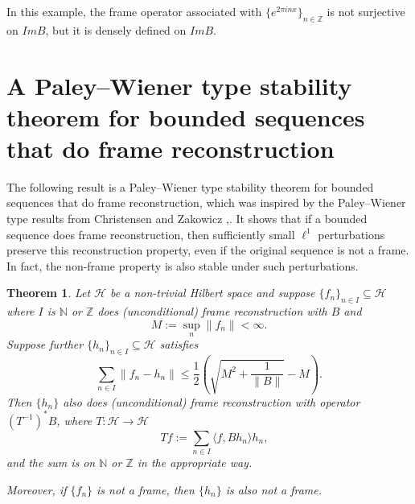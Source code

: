 \documentclass[11pt]{amsart}
\newtheorem{thm}{Theorem}[section]
\theoremstyle{definition}
\numberwithin{equation}{section}
\newcommand{\Hcal}{\mathcal{H}} %
\begin{document}
In this example, the frame operator associated with $\{e^{2\pi i nx}\}_{n\in \mathbb{Z}}$ is not surjective on $ImB$, but it is densely defined on $Im B$.

\section{A Paley–Wiener type stability theorem for bounded sequences that do frame reconstruction}\label{s5}
The following result is a Paley–Wiener type stability theorem for bounded sequences that do frame reconstruction, which was inspired by the Paley–Wiener type results from Christensen and Zakowicz \cite{Christensen2017Paley-Wiener},\cite{Christensen1995Paley-Wiener}. It shows that if a bounded sequence does frame reconstruction, then sufficiently small $\ell^1$ perturbations preserve this reconstruction property, even if the original sequence is not a frame. In fact, the non-frame property is also stable under such perturbations.
\begin{thm}
Let $\Hcal$ be a non-trivial Hilbert space and suppose $\{f_{n}\}_{n\in I}\subseteq \Hcal$ where $I$ is $\mathbb{N}$ or $\mathbb{Z}$ does (unconditional) frame reconstruction with $B$ and
\[
M := \sup_n \|f_n\| < \infty.
\]
Suppose further \(\{h_n\}_{n\in I}\subseteq \mathcal{H}\) satisfies
\[
\sum_{n\in I} \|f_n - h_n\| \leq \frac{1}{2}\left(\sqrt{M^2 + \frac{1}{\|B\|}} - M \right).
\]
Then \(\{h_n\}\) also does (unconditional) frame reconstruction with operator \newline \((T^{-1})^{*} B\), where
$
T : \mathcal{H} \to \mathcal{H}$ $$ \quad T f := \sum_{n\in I} \langle f, Bh_n \rangle h_n,
$$
and the sum is on $\mathbb{N}$ or $\mathbb{Z}$ in the appropriate way.

Moreover, if \(\{f_n\}\) is \emph{not} a frame, then \(\{h_n\}\) is also \emph{not} a frame.
\end{thm}
\end{document}
